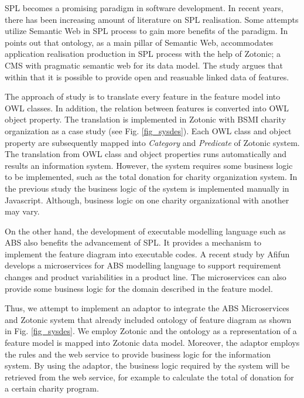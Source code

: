 \documentclass[conference]{IEEEtran}
\begin{document}
SPL becomes a promising paradigm in software development. In recent years, there has been increasing amount of literature on SPL realisation. Some attempts utilize Semantic Web in SPL process to gain more benefits of the paradigm. In \cite{fmontology} points out that ontology, as a main pillar of Semantic Web, accommodates application realisation production in SPL process with the help of Zotonic; a CMS with pragmatic semantic web for its data model. The study argues that within that it is possible to provide open and reasuable linked data of features.

The approach of study \cite{fmontology} is to translate every feature in the feature model into OWL classes. In addition, the relation between features is converted into OWL object property. The translation is implemented in Zotonic with BSMI charity organization as a case study (see Fig. \ref{fig_sysdes}). Each OWL class and object property are subsequently mapped into \textit{Category} and \textit{Predicate} of Zotonic system. The translation from OWL class and object properties runs automatically and results an information system. However, the system requires some business logic to be implemented, such as the total donation for charity organization system. In the previous study \cite{bravyto} the business logic of the system is implemented manually in Javascript. Although, business logic on one charity organizational with another may vary. 

On the other hand, the development of executable modelling language such as ABS \cite{ABS} also benefits the advancement of SPL. It provides a mechanism to implement the feature diagram into executable codes. A recent study by Afifun \cite{absmc} develops a microservices for ABS modelling language to support requirement changes and product variabilities in a product line. The microservices can also provide some business logic for the domain described in the feature model.

Thus, we attempt to implement an adaptor to integrate the ABS Microservices and Zotonic system that already included ontology of feature diagram as shown in Fig. \ref{fig_sysdes}. We employ Zotonic and the ontology as a representation of a feature model is mapped into Zotonic data model. Moreover, the adaptor employs the rules and the web service to provide business logic for the information system. By using the adaptor, the business logic required by the system will be retrieved from the web service, for example to calculate the total of donation for a certain charity program.
\end{document}
